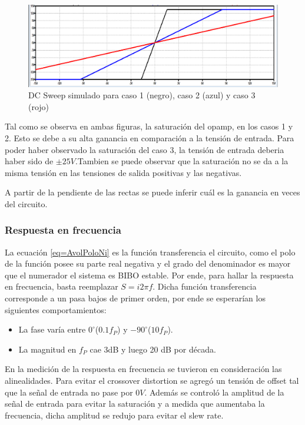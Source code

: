 \documentclass[../../main.tex]{subfiles}
\begin{document}
\begin{figure}[H]
\centering
\includegraphics[width=1.1\textwidth]{imagenes/dc_sweep_n_sim.png}
\caption{DC Sweep simulado para caso 1 (negro), caso 2 (azul) y caso 3 (rojo)} \label{fig=dcnSim}
\end{figure}

Tal como se observa  en ambas figuras, la saturaci\'on del opamp, en los casos 1 y 2. Esto se debe a su alta ganancia en comparaci\'on a la tensi\'on de entrada. Para poder haber observado la saturación del caso 3, la tensi\'on de entrada deberia haber sido de  $\pm 25 V$.Tambien se puede observar que la saturación no se da a la misma tensi\'on en las tensiones de salida positivas y las negativas.\par
A partir de la pendiente de las rectas se puede inferir cu\'al es la ganancia en veces del circuito.




\subsubsection{Respuesta en frecuencia}

La ecuación \ref{eq=AvolPoloNi} es la función transferencia el circuito, como el polo de la función posee su parte real negativa y el grado del denominador es mayor que el numerador el sistema es BIBO estable. Por ende, para hallar la respuesta en frecuencia, basta reemplazar $S=i2 \pi f$. Dicha función transferencia corresponde a un pasa bajos de primer orden, por ende se esperarían los siguientes comportamientos:
\begin{itemize}  
\item La fase var\'ia entre $0^{\circ}$($0.1 f_{P}$) y $-90^{\circ}$($10 f_{P}$).
\item La magnitud en $f_{P}$ cae 3dB y luego 20 dB por década.
\end{itemize}  

En la medición de la respuesta en frecuencia se tuvieron en consideración las alinealidades. Para evitar el crossover distortion se agregó un tensión de offset tal que la señal de entrada no pase por $0V$. Además se controló la amplitud de la señal de entrada para evitar la saturación y a medida que aumentaba la frecuencia, dicha amplitud se redujo para evitar el slew rate.
\end{document}
